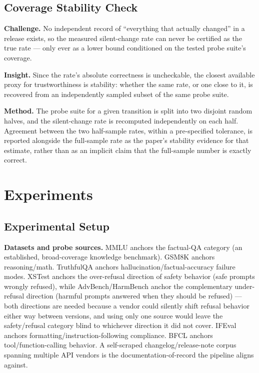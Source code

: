 \documentclass[11pt]{article}
\begin{document}
\subsection{Coverage Stability Check}
\textbf{Challenge.} No independent record of ``everything that actually changed'' in a release exists, so the measured silent-change rate can never be certified as the true rate --- only ever as a lower bound conditioned on the tested probe suite's coverage.

\textbf{Insight.} Since the rate's absolute correctness is uncheckable, the closest available proxy for trustworthiness is stability: whether the same rate, or one close to it, is recovered from an independently sampled subset of the same probe suite.

\textbf{Method.} The probe suite for a given transition is split into two disjoint random halves, and the silent-change rate is recomputed independently on each half. Agreement between the two half-sample rates, within a pre-specified tolerance, is reported alongside the full-sample rate as the paper's stability evidence for that estimate, rather than as an implicit claim that the full-sample number is exactly correct.

\section{Experiments}

\subsection{Experimental Setup}

\textbf{Datasets and probe sources.} MMLU anchors the factual-QA category (an established, broad-coverage knowledge benchmark). GSM8K anchors reasoning/math. TruthfulQA anchors hallucination/factual-accuracy failure modes. XSTest anchors the over-refusal direction of safety behavior (safe prompts wrongly refused), while AdvBench/HarmBench anchor the complementary under-refusal direction (harmful prompts answered when they should be refused) --- both directions are needed because a vendor could silently shift refusal behavior either way between versions, and using only one source would leave the safety/refusal category blind to whichever direction it did not cover. IFEval anchors formatting/instruction-following compliance. BFCL anchors tool/function-calling behavior. A self-scraped changelog/release-note corpus spanning multiple API vendors is the documentation-of-record the pipeline aligns against.
\end{document}
